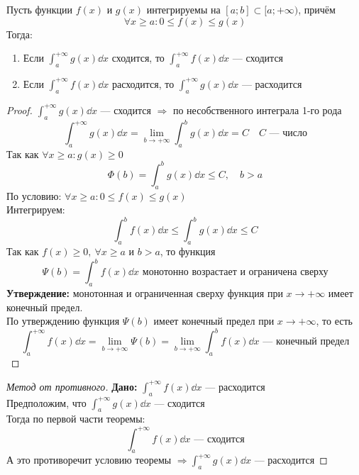 \begin{theorem}
    Пусть функции $f(x)$ и $g(x)$ интегрируемы на $[a;b]\subset [a; +\infty)$, причём \[ \forall x \geqslant a\colon 0 \leqslant f(x) \leqslant g(x) \] Тогда:
    \begin{enumerate}
        \item Если $\int_{a}^{+\infty} g(x)\dd{x}$ сходится, то $\int_{a}^{+\infty} f(x)\dd{x}$ --- сходится
        \item Если $\int_{a}^{+\infty} f(x)\dd{x}$ расходится, то $\int_{a}^{+\infty} g(x)\dd{x}$ --- расходится
    \end{enumerate}
\end{theorem}
\begin{proof}
    $\int_{a}^{+\infty} g(x)\dd{x}$ --- сходится $\Rightarrow$ по  несобственного интеграла 1-го рода
    \[
        \int_{a}^{+\infty} g(x)\dd{x} = \lim\limits_{b \to +\infty} \int_{a}^{b} g(x)\dd{x} = C\quad C \text{ --- число}
    \]
    Так как $\forall x \geqslant a\colon g(x) \geqslant 0$ \vspace{-\topsep}
    \[
        \Phi (b) = \int_{a}^{b} g(x)\dd{x} \leqslant C,\quad b > a
    \]
    По условию: $\forall x \geqslant a\colon 0 \leqslant f(x) \leqslant g(x)$\\
    Интегрируем:
    \[
        \int_{a}^{b} f(x)\dd{x} \leqslant \int_{a}^{b} g(x)\dd{x} \leqslant C
    \]
    Так как $f(x) \geqslant 0,\ \forall x \geqslant a$ и $b > a$, то функция
    \[
        \Psi (b) = \int_{a}^{b} f(x)\dd{x} \text{ монотонно возрастает и ограничена сверху}
    \]
    \textbf{Утверждение:} монотонная и ограниченная сверху функция при $x \to +\infty$ имеет конечный предел.\\
    По утверждению функция $\Psi(b)$ имеет конечный предел при $x\to +\infty$, то есть
    \[
        \int_{a}^{+\infty} f(x)\dd{x} = \lim\limits_{b \to +\infty}  \Psi(b) = \lim\limits_{b \to +\infty} \int_{a}^{b}f(x)\dd{x} \text{ --- конечный предел}
    \]
\end{proof}
\begin{proof}[Метод от противного]
    \textbf{Дано:} $\int_{a}^{+\infty}f(x)\dd{x}$ --- расходится\\
    Предположим, что $\int_{a}^{+\infty}g(x)\dd{x}$ --- сходится\\
    Тогда по первой части теоремы:
    \[
        \int_{a}^{+\infty} f(x)\dd{x} \text{ --- сходится} 
    \]
    А это противоречит условию теоремы $\Rightarrow \int_{a}^{+\infty} g(x)\dd{x}$ --- расходится
\end{proof}

